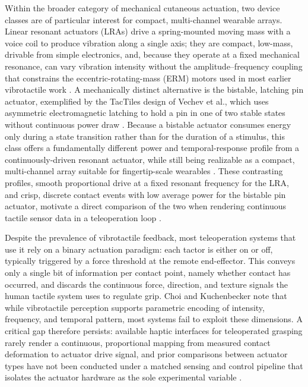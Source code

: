 \documentclass[12pt, a4paper]{report}
\begin{document}
Within the broader category of mechanical cutaneous actuation, two device classes are of particular interest for compact, multi-channel wearable arrays. Linear resonant actuators (LRAs) drive a spring-mounted moving mass with a voice coil to produce vibration along a single axis; they are compact, low-mass, drivable from simple electronics, and, because they operate at a fixed mechanical resonance, can vary vibration intensity without the amplitude–frequency coupling that constrains the eccentric-rotating-mass (ERM) motors used in most earlier vibrotactile work \cite{pacchierotti2017}. A mechanically distinct alternative is the bistable, latching pin actuator, exemplified by the TacTiles design of Vechev et al., which uses asymmetric electromagnetic latching to hold a pin in one of two stable states without continuous power draw \cite{vechev2019}. Because a bistable actuator consumes energy only during a state transition rather than for the duration of a stimulus, this class offers a fundamentally different power and temporal-response profile from a continuously-driven resonant actuator, while still being realizable as a compact, multi-channel array suitable for fingertip-scale wearables \cite{vechev2019}. These contrasting profiles, smooth proportional drive at a fixed resonant frequency for the LRA, and crisp, discrete contact events with low average power for the bistable pin actuator, motivate a direct comparison of the two when rendering continuous tactile sensor data in a teleoperation loop \cite{choi2013}.

Despite the prevalence of vibrotactile feedback, most teleoperation systems that use it rely on a binary actuation paradigm: each tactor is either on or off, typically triggered by a force threshold at the remote end-effector. This conveys only a single bit of information per contact point, namely whether contact has occurred, and discards the continuous force, direction, and texture signals the human tactile system uses to regulate grip. Choi and Kuchenbecker \cite{choi2013} note that while vibrotactile perception supports parametric encoding of intensity, frequency, and temporal pattern, most systems fail to exploit these dimensions. A critical gap therefore persists: available haptic interfaces for teleoperated grasping rarely render a continuous, proportional mapping from measured contact deformation to actuator drive signal, and prior comparisons between actuator types have not been conducted under a matched sensing and control pipeline that isolates the actuator hardware as the sole experimental variable \cite{pacchierotti2017}.
\end{document}
